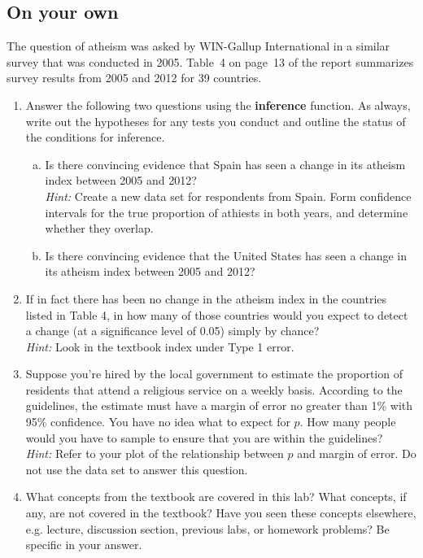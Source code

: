 \documentclass{article}\usepackage[]{graphicx}\usepackage[]{color}
\newcommand{\hlkwd}[1]{\textcolor[rgb]{0.737,0.353,0.396}{\textbf{#1}}}%
\begin{document}
\subsection*{On your own}
The question of atheism was asked by WIN-Gallup International in a similar survey that was conducted in 2005.  Table~4 on page~13 of the report summarizes survey results from 2005 and 2012 for 39 countries.


\begin{enumerate}
\item Answer the following two questions using the \hlkwd{inference} function. As always, write out the hypotheses for any tests you conduct and outline the status of the conditions for inference.
\begin{enumerate}[(a)]
\item Is there convincing evidence that Spain has seen a change in its atheism index between 2005 and 2012? \\
\textit{Hint:} Create a new data set for respondents from Spain. Form confidence intervals for the true proportion of athiests in both years, and determine whether they overlap. 
\item Is there convincing evidence that the United States has seen a change in its atheism index between 2005 and 2012?
\end{enumerate}

\item If in fact there has been no change in the atheism index in the countries listed in Table 4, in how many of those countries would you expect to detect a change (at a significance level of 0.05) simply by chance? \\
\textit{Hint:} Look in the textbook index under Type 1 error.

\item Suppose you're hired by the local government to estimate the proportion of residents that attend a religious service on a weekly basis. According to the guidelines, the estimate must have a margin of error no greater than 1\% with 95\% confidence. You have no idea what to expect for $p$. How many people would you have to sample to ensure that you are within the guidelines?\\
\textit{Hint:} Refer to your plot of the relationship between $p$ and margin of error. Do not use the data set to answer this question.

\item What concepts from the textbook are covered in this lab? What concepts, if any, are not covered in the textbook? Have you seen these concepts elsewhere, e.g. lecture, discussion section, previous labs, or homework problems? Be specific in your answer.
\end{enumerate}
\end{document}
